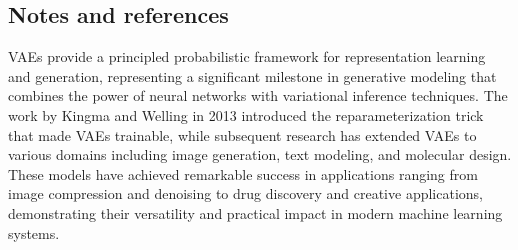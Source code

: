 \subsection{Notes and references}

VAEs provide a principled probabilistic framework for representation learning and generation, representing a significant milestone in generative modeling that combines the power of neural networks with variational inference techniques. The work by Kingma and Welling in 2013 introduced the reparameterization trick that made VAEs trainable, while subsequent research has extended VAEs to various domains including image generation, text modeling, and molecular design. These models have achieved remarkable success in applications ranging from image compression and denoising to drug discovery and creative applications, demonstrating their versatility and practical impact in modern machine learning systems.
